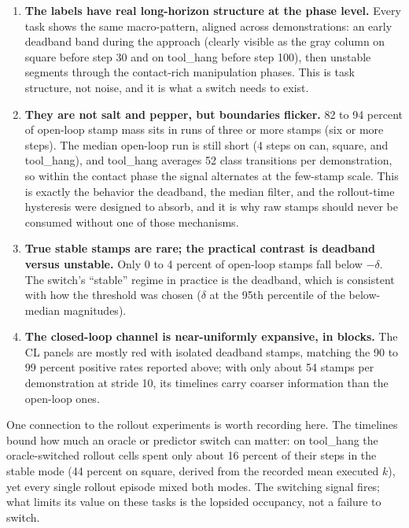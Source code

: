 \documentclass[11pt]{article}
\begin{document}
\begin{enumerate}[leftmargin=2em]
  \item \textbf{The labels have real long-horizon structure at the phase
        level.} Every task shows the same macro-pattern, aligned across
        demonstrations: an early deadband band during the approach (clearly
        visible as the gray column on square before step 30 and on tool\_hang
        before step 100), then unstable segments through the
        contact-rich manipulation phases. This is task structure, not noise,
        and it is what a switch needs to exist.
  \item \textbf{They are not salt and pepper, but boundaries flicker.} 82 to
        94 percent of open-loop stamp mass sits in runs of three or more
        stamps (six or more steps). The median open-loop run is still short
        (4 steps on can, square, and tool\_hang), and tool\_hang averages 52
        class transitions per demonstration, so within the contact phase the
        signal alternates at the few-stamp scale. This is exactly the
        behavior the deadband, the median filter, and the rollout-time
        hysteresis were designed to absorb, and it is why raw stamps should
        never be consumed without one of those mechanisms.
  \item \textbf{True stable stamps are rare; the practical contrast is
        deadband versus unstable.} Only 0 to 4 percent of open-loop stamps
        fall below $-\delta$. The switch's ``stable'' regime in practice is
        the deadband, which is consistent with how the threshold was chosen
        ($\delta$ at the 95th percentile of the below-median magnitudes).
  \item \textbf{The closed-loop channel is near-uniformly expansive, in
        blocks.} The CL panels are mostly red with isolated deadband stamps,
        matching the 90 to 99 percent positive rates reported above; with
        only about 54 stamps per demonstration at stride 10, its timelines
        carry coarser information than the open-loop ones.
\end{enumerate}

One connection to the rollout experiments is worth recording here. The
timelines bound how much an oracle or predictor switch can matter: on
tool\_hang the oracle-switched rollout cells spent only about 16 percent of
their steps in the stable mode (44 percent on square, derived from the
recorded mean executed $k$), yet every single rollout episode mixed both
modes. The switching signal fires; what limits its value on these tasks is the
lopsided occupancy, not a failure to switch.
\end{document}
